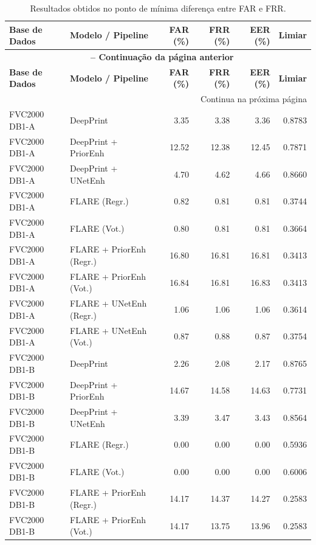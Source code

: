 {\small
\begin{longtable}{llrrrr}
\caption{Resultados obtidos no ponto de m\'inima diferen\c{c}a entre FAR e FRR.}\label{tab:min_diff_completo} \\
\toprule
\textbf{Base de Dados} & \textbf{Modelo / Pipeline} & \textbf{FAR (\%)} & \textbf{FRR (\%)} & \textbf{EER (\%)} & \textbf{Limiar} \\
\midrule
\endfirsthead
\multicolumn{6}{c}{{\bfseries \tablename\ \thetable{} -- Continua\c{c}\~ao da p\'agina anterior}} \\
\toprule
\textbf{Base de Dados} & \textbf{Modelo / Pipeline} & \textbf{FAR (\%)} & \textbf{FRR (\%)} & \textbf{EER (\%)} & \textbf{Limiar} \\
\midrule
\endhead
\midrule
\multicolumn{6}{r}{{Continua na pr\'oxima p\'agina}} \\
\endfoot
\bottomrule
\endlastfoot
FVC2000 DB1-A & DeepPrint & 3.35 & 3.38 & 3.36 & 0.8783 \\
FVC2000 DB1-A & DeepPrint + PriorEnh & 12.52 & 12.38 & 12.45 & 0.7871 \\
FVC2000 DB1-A & DeepPrint + UNetEnh & 4.70 & 4.62 & 4.66 & 0.8660 \\
FVC2000 DB1-A & FLARE (Regr.) & 0.82 & 0.81 & 0.81 & 0.3744 \\
FVC2000 DB1-A & FLARE (Vot.) & 0.80 & 0.81 & 0.81 & 0.3664 \\
FVC2000 DB1-A & FLARE + PriorEnh (Regr.) & 16.80 & 16.81 & 16.81 & 0.3413 \\
FVC2000 DB1-A & FLARE + PriorEnh (Vot.) & 16.84 & 16.81 & 16.83 & 0.3413 \\
FVC2000 DB1-A & FLARE + UNetEnh (Regr.) & 1.06 & 1.06 & 1.06 & 0.3614 \\
FVC2000 DB1-A & FLARE + UNetEnh (Vot.) & 0.87 & 0.88 & 0.87 & 0.3754 \\
\midrule
FVC2000 DB1-B & DeepPrint & 2.26 & 2.08 & 2.17 & 0.8765 \\
FVC2000 DB1-B & DeepPrint + PriorEnh & 14.67 & 14.58 & 14.63 & 0.7731 \\
FVC2000 DB1-B & DeepPrint + UNetEnh & 3.39 & 3.47 & 3.43 & 0.8564 \\
FVC2000 DB1-B & FLARE (Regr.) & 0.00 & 0.00 & 0.00 & 0.5936 \\
FVC2000 DB1-B & FLARE (Vot.) & 0.00 & 0.00 & 0.00 & 0.6006 \\
FVC2000 DB1-B & FLARE + PriorEnh (Regr.) & 14.17 & 14.37 & 14.27 & 0.2583 \\
FVC2000 DB1-B & FLARE + PriorEnh (Vot.) & 14.17 & 13.75 & 13.96 & 0.2583 \\

\end{longtable}}
